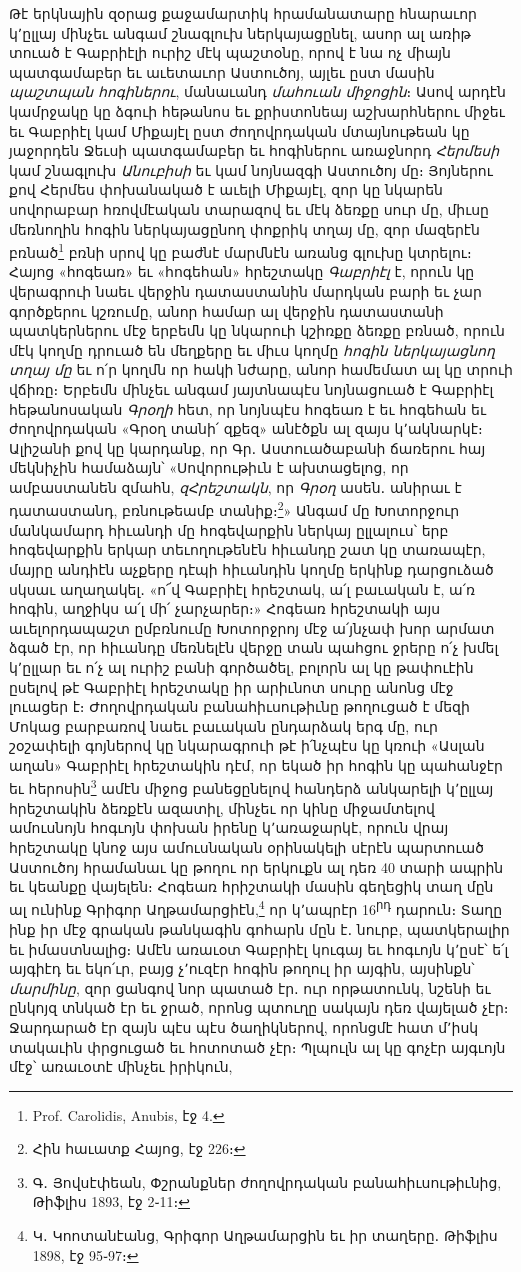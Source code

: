 \documentclass{article}
\begin{document}
{Թէ երկնային զօրաց քաջամարտիկ հրամանատարը հնարաւոր կ՚ըլլայ մինչեւ անգամ շնագլուխ ներկայացընել, ասոր ալ առիթ տուած է Գաբրիէլի ուրիշ մէկ պաշտօնը, որով է նա ոչ միայն պատգամաբեր եւ աւետաւոր Աստուծոյ, այլեւ ըստ մասին \emph{պաշտպան հոգիներու}, մանաւանդ \emph{մահուան միջոցին}։ Ասով արդէն կամրջակը կը ձգուի հեթանոս եւ քրիստոնեայ աշխարհներու միջեւ եւ Գաբրիէլ կամ Միքայէլ ըստ ժողովրդական մտայնութեան կը յաջորդեն Ջեւսի պատգամաբեր եւ հոգիներու առաջնորդ \emph{Հերմեսի} կամ շնագլուխ \emph{Անուբիսի} եւ կամ նոյնազգի Աստուծոյ մը։ Յոյներու քով Հերմես փոխանակած է աւելի Միքայէլ, զոր կը նկարեն սովորաբար հռովմէական տարազով եւ մէկ ձեռքը սուր մը, միւսը մեռնողին հոգին ներկայացընող փոքրիկ տղայ մը, զոր մազերէն բռնած\footnote{Prof. Carolidis, Anubis, էջ 4.} բռնի սրով կը բաժնէ մարմնէն առանց գլուխը կտրելու։ Հայոց «հոգեառ» եւ «հոգեհան» հրեշտակը \emph{Գաբրիէլ} է, որուն կը վերագրուի նաեւ վերջին դատաստանին մարդկան բարի եւ չար գործքերու կշռումը, անոր համար ալ վերջին դատաստանի պատկերներու մէջ երբեմն կը նկարուի կշիռքը ձեռքը բռնած, որուն մէկ կողմը դրուած են մեղքերը եւ միւս կողմը \emph{հոգին ներկայացնող տղայ մը} եւ ո՛ր կողմն որ հակի նժարը, անոր համեմատ ալ կը տրուի վճիռը։ Երբեմն մինչեւ անգամ յայտնապէս նոյնացուած է Գաբրիէլ հեթանոսական \emph{Գրօղի} հետ, որ նոյնպէս հոգեառ է եւ հոգեհան եւ ժողովրդական «Գրօղ տանի՛ զքեզ» անէծքն ալ զայս կ՚ակնարկէ։ Ալիշանի քով կը կարդանք, որ Գր․ Աստուածաբանի ճառերու հայ մեկնիչին համաձայն՝ «Սովորութիւն է ախտացելոց, որ ամբաստանեն զմահն, \emph{զՀրեշտակն}, որ \emph{Գրօղ} ասեն․ անիրաւ է դատաստանդ, բռնութեամբ տանիք։\footnote{Հին հաւատք Հայոց, էջ 226։}» Անգամ մը Խոտորջուր մանկամարդ հիւանդի մը հոգեվարքին ներկայ ըլլալուս՝ երբ հոգեվարքին երկար տեւողութենէն հիւանդը շատ կը տառապէր, մայրը անդիէն աչքերը դէպի հիւանդին կողմը երկինք դարցուձած սկսաւ աղաղակել․ «ո՜վ Գաբրիէլ հրեշտակ, ա՛լ բաւական է, ա՛ռ հոգին, աղջիկս ա՛լ մի՛ չարչարեր։» Հոգեառ հրեշտակի այս աւելորդապաշտ ըմբռնումը Խոտորջրոյ մէջ ա՛յնչափ խոր արմատ ձգած էր, որ հիւանդը մեռնելէն վերջը տան պահցու ջրերը ո՛չ խմել կ՚ըլլար եւ ո՛չ ալ ուրիշ բանի գործածել, բոլորն ալ կը թափուէին ըսելով թէ Գաբրիէլ հրեշտակը իր արիւնոտ սուրը անոնց մէջ լուացեր է։ Ժողովրդական բանահիւսութիւնը թողուցած է մեզի Մոկաց բարբառով նաեւ բաւական ընդարձակ երգ մը, ուր շօշափելի գոյներով կը նկարագրուի թէ ի՛նչպէս կը կռուի «Ասլան աղան» Գաբրիէլ հրեշտակին դէմ, որ եկած իր հոգին կը պահանջէր եւ հերոսին\footnote{Գ․ Յովսէփեան, Փշրանքներ ժողովրդական բանահիւսութիւնից, Թիֆլիս 1893, էջ 2֊11։} ամէն միջոց բանեցընելով հանդերձ անկարելի կ՚ըլլայ հրեշտակին ձեռքէն ազատիլ, մինչեւ որ կինը միջամտելով ամուսնոյն հոգւոյն փոխան իրենը կ՚առաջարկէ, որուն վրայ հրեշտակը կնոջ այս ամուսնական օրինակելի սէրէն պարտուած Աստուծոյ հրամանաւ կը թողու որ երկուքն ալ դեռ 40 տարի ապրին եւ կեանքը վայելեն։ Հոգեառ հրիշտակի մասին գեղեցիկ տաղ մըն ալ ունինք Գրիգոր Աղթամարցիէն,\footnote{Կ․ Կոոտանէանց, Գրիգոր Աղթամարցին եւ իր տաղերը․ Թիֆլիս 1898, էջ 95֊97։} որ կ՚ապրէր 16\textsuperscript{րդ} դարուն։ Տաղը ինք իր մէջ գրական թանկագին գոհարն մըն է․ նուրբ, պատկերալիր եւ իմաստնալից։ Ամէն առաւօտ Գաբրիէլ կուգայ եւ հոգւոյն կ՚ըսէ՝ ե՛լ այգիէդ եւ եկո՛ւր, բայց չ՚ուզէր հոգին թողուլ իր այգին, այսինքն՝ \emph{մարմինը}, զոր ցանգով նոր պատած էր․ ուր որթատունկ, նշենի եւ ընկոյզ տնկած էր եւ ջրած, որոնց պտուղը սակայն դեռ վայելած չէր։ Ջարդարած էր զայն պէս պէս ծաղիկներով, որոնցմէ հատ մ՚իսկ տակաւին փրցուցած եւ հոտոտած չէր։ Պլպուլն ալ կը գոչէր այգւոյն մէջ՝ առաւօտէ մինչեւ իրիկուն, }
\end{document}
